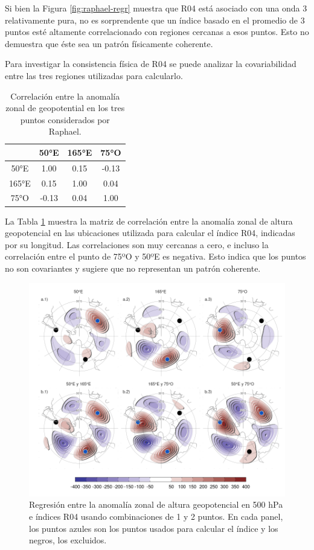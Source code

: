 \documentclass[12pt,oneside,a4paper]{reedthesis}
\begin{document}
Si bien la Figura \ref{fig:raphael-regr} muestra que R04 está asociado con una onda 3 relativamente pura, no es sorprendente que un índice basado en el promedio de 3 puntos esté altamente correlacionado con regiones cercanas a esos puntos.
Esto no demuestra que éste sea un patrón físicamente coherente.

Para investigar la consistencia física de R04 se puede analizar la covariabilidad entre las tres regiones utilizadas para calcularlo.

\begin{table}

\caption{\label{tab:raphael-correlation}Correlación entre la anomalía zonal de geopotential en los tres puntos considerados por Raphael.}
\centering
\begin{tabular}[t]{cccc}
\toprule
 & 50°E & 165°E & 75°O\\
\midrule
50°E & 1.00 & 0.15 & -0.13\\
165°E & 0.15 & 1.00 & 0.04\\
75°O & -0.13 & 0.04 & 1.00\\
\bottomrule
\end{tabular}
\end{table}

La Tabla \ref{tab:raphael-correlation} muestra la matriz de correlación entre la anomalía zonal de altura geopotencial en las ubicaciones utilizada para calcular el índice R04, indicadas por su longitud.
Las correlaciones son muy cercanas a cero, e incluso la correlación entre el punto de 75ºO y 50ºE es negativa.
Esto indica que los puntos no son covariantes y sugiere que no representan un patrón coherente.

\begin{figure}

{\centering \includegraphics{figures/15-onda3/cor-puntos-1} 

}

\caption{Regresión entre la anomalía zonal de altura geopotencial en 500 hPa e índices R04 usando combinaciones de 1 y 2 puntos. En cada panel, los puntos azules son los puntos usados para calcular el índice y los negros, los excluidos.}\label{fig:cor-puntos}
\end{figure}
\end{document}
